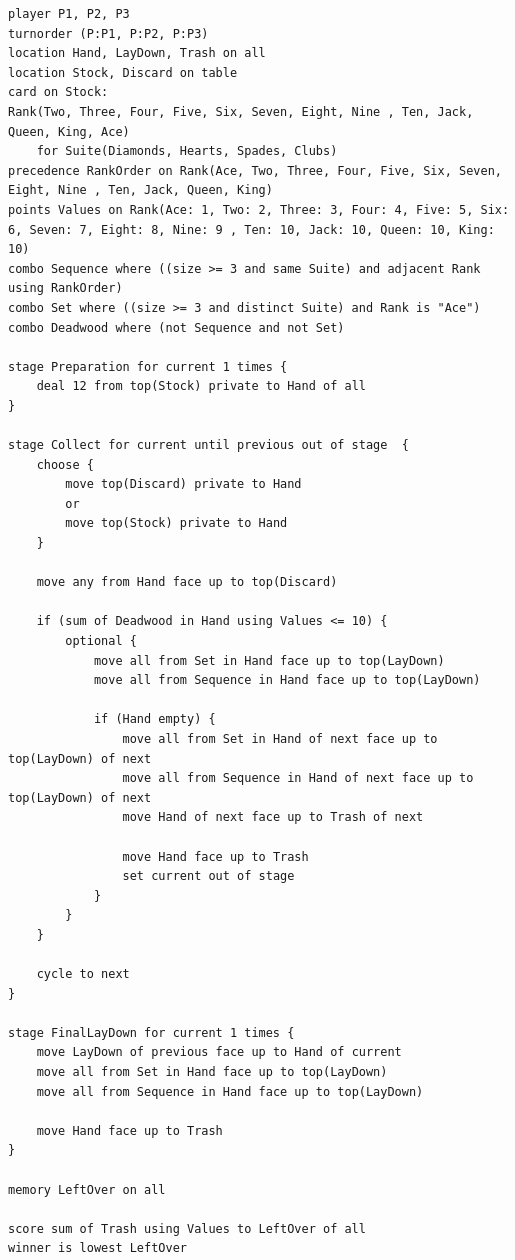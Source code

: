 \documentclass[a4paper,11pt]{article}
\begin{document}
\begin{lstlisting}
player P1, P2, P3
turnorder (P:P1, P:P2, P:P3)
location Hand, LayDown, Trash on all
location Stock, Discard on table
card on Stock:
Rank(Two, Three, Four, Five, Six, Seven, Eight, Nine , Ten, Jack, Queen, King, Ace)
    for Suite(Diamonds, Hearts, Spades, Clubs)
precedence RankOrder on Rank(Ace, Two, Three, Four, Five, Six, Seven, Eight, Nine , Ten, Jack, Queen, King)
points Values on Rank(Ace: 1, Two: 2, Three: 3, Four: 4, Five: 5, Six: 6, Seven: 7, Eight: 8, Nine: 9 , Ten: 10, Jack: 10, Queen: 10, King: 10)
combo Sequence where ((size >= 3 and same Suite) and adjacent Rank using RankOrder)
combo Set where ((size >= 3 and distinct Suite) and Rank is "Ace")
combo Deadwood where (not Sequence and not Set)

stage Preparation for current 1 times {
    deal 12 from top(Stock) private to Hand of all
}

stage Collect for current until previous out of stage  {
    choose {
        move top(Discard) private to Hand
        or
        move top(Stock) private to Hand
    }

    move any from Hand face up to top(Discard)

    if (sum of Deadwood in Hand using Values <= 10) {
        optional {
            move all from Set in Hand face up to top(LayDown)
            move all from Sequence in Hand face up to top(LayDown)

            if (Hand empty) {
                move all from Set in Hand of next face up to top(LayDown) of next
                move all from Sequence in Hand of next face up to top(LayDown) of next
                move Hand of next face up to Trash of next

                move Hand face up to Trash
                set current out of stage
            }
        }
    }

    cycle to next
}

stage FinalLayDown for current 1 times {
    move LayDown of previous face up to Hand of current
    move all from Set in Hand face up to top(LayDown)
    move all from Sequence in Hand face up to top(LayDown)

    move Hand face up to Trash
}

memory LeftOver on all

score sum of Trash using Values to LeftOver of all
winner is lowest LeftOver
\end{lstlisting}
\end{document}
